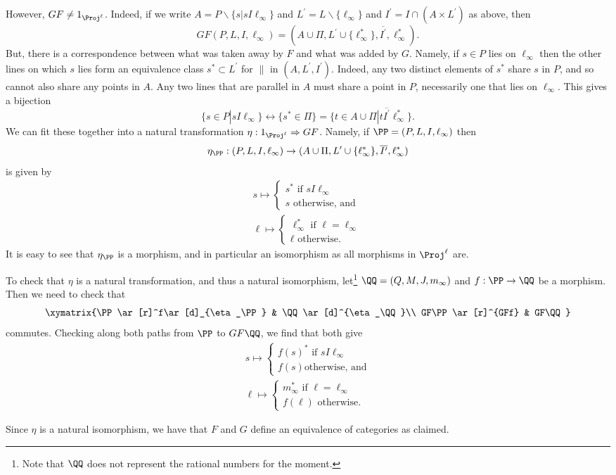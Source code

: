 \documentclass[../../main]{subfiles}
\begin{document}
\subparagraph{}
However, $GF\ne 1_{\Proj^\ell}$. Indeed, if we write
$A=P\backslash\{s|sI\ell_\infty\}$ and $L^\prime =L\backslash\{\ell_\infty\}$
and $I^\prime=I\cap(A\times L^\prime)$ as above, then
\[GF(P,L,I,\ell_\infty)=(A\cup\Pi,
L^\prime\cup\{\ell^*_\infty\},\overline{I^\prime},\ell^*_\infty).\] But, there
is a correspondence between what was taken away by $F$ and what was added by
$G$. Namely, if $s\in P$ lies on $\ell_\infty$ then the other lines on which $s$
lies form an equivalence class $s^*\subset L^\prime$ for $\parallel$ in
$(A,L^\prime,I^\prime)$. Indeed, any two distinct elements of $s^*$ share $s$ in
$P$, and so cannot also share any points in $A$. Any two lines that are parallel
in  $A$ must share a point in $P$, necessarily one that lies on $\ell_\infty$.
This gives a bijection \[\{s\in
P|sI\ell_\infty\}\leftrightarrow\{s^*\in\Pi\}=\{t\in
A\cup\Pi|t\overline{I^\prime}\ell_\infty^*\}.\] We can fit these together into a
natural transformation $\eta:1_{\Proj^\ell}\Rightarrow GF$. Namely, if
$\PP=(P,L,I,\ell_\infty)$ then \[\eta_{\PP}:(P,L,I,\ell_\infty)\rightarrow
(A\cup\Pi, L^\prime\cup\{\ell^*_\infty\},\overline{I^\prime},\ell^*_\infty)\] is
given by
\[\begin{array}{l}
		s\mapsto\begin{cases} s^*\text{ if }sI\ell_\infty\\ s\text{ otherwise,
		and}\end{cases}\\
		\ell\mapsto\begin{cases} \ell^*_\infty\text{ if }\ell=\ell_\infty\\
		\ell\text{ otherwise.}\end{cases}
	\end{array}
\]
It is easy to see that $\eta_{\PP}$ is a morphism, and in particular an
isomorphism as all morphisms in $\Proj^\ell$ are.

To check that $\eta$ is a natural transformation, and thus a natural
isomorphism, let\footnote{Note that $\QQ$ does not represent the rational
numbers for the moment.} $\QQ=(Q,M,J,m_\infty)$ and $f:\PP\rightarrow\QQ$ be a
morphism. Then we need to check that \[\xymatrix{\PP\ar[r]^f\ar[d]_{\eta_\PP} &
\QQ\ar[d]^{\eta_\QQ}\\ GF\PP\ar[r]^{GFf} & GF\QQ}\] commutes. Checking along
both paths from $\PP$ to $GF\QQ$, we find that both give
\[\begin{array}{l}
		s\mapsto\begin{cases} f(s)^*\text{ if }sI\ell_\infty\\ f(s)\text{
		otherwise, and}\end{cases}\\
		\ell\mapsto\begin{cases} m^*_\infty\text{ if }\ell=\ell_\infty\\
		f(\ell)\text{ otherwise.}\end{cases}
	\end{array}
\]

Since $\eta$ is a natural isomorphism, we have that $F$ and $G$ define an
equivalence of categories as claimed.
\end{document}
